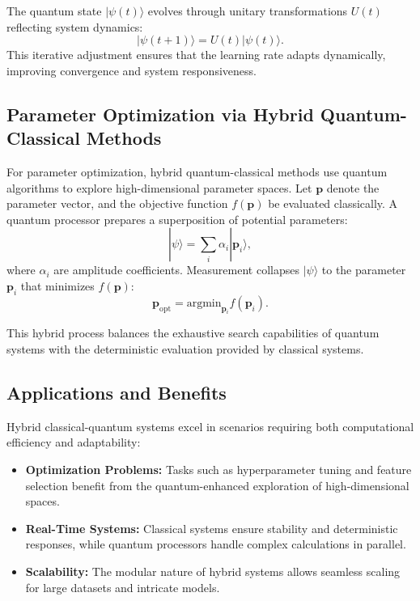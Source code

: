 \documentclass{article}
\theoremstyle{plain}
\begin{document}
The quantum state \( |\psi(t)\rangle \) evolves through unitary transformations \( U(t) \) reflecting system dynamics:
\begin{equation}
|\psi(t+1)\rangle = U(t) |\psi(t)\rangle.
\end{equation}
This iterative adjustment ensures that the learning rate adapts dynamically, improving convergence and system responsiveness.

\subsection{Parameter Optimization via Hybrid Quantum-Classical Methods}
For parameter optimization, hybrid quantum-classical methods use quantum algorithms to explore high-dimensional parameter spaces. Let \( \mathbf{p} \) denote the parameter vector, and the objective function \( f(\mathbf{p}) \) be evaluated classically. A quantum processor prepares a superposition of potential parameters:
\begin{equation}
|\psi\rangle = \sum_{i} \alpha_i |\mathbf{p}_i\rangle,
\end{equation}
where \( \alpha_i \) are amplitude coefficients. Measurement collapses \( |\psi\rangle \) to the parameter \( \mathbf{p}_i \) that minimizes \( f(\mathbf{p}) \):
\begin{equation}
\mathbf{p}_{\text{opt}} = \text{argmin}_{\mathbf{p}_i} f(\mathbf{p}_i).
\end{equation}

This hybrid process balances the exhaustive search capabilities of quantum systems with the deterministic evaluation provided by classical systems.

\subsection{Applications and Benefits}
Hybrid classical-quantum systems excel in scenarios requiring both computational efficiency and adaptability:
\begin{itemize}
    \item \textbf{Optimization Problems:} Tasks such as hyperparameter tuning and feature selection benefit from the quantum-enhanced exploration of high-dimensional spaces.
    \item \textbf{Real-Time Systems:} Classical systems ensure stability and deterministic responses, while quantum processors handle complex calculations in parallel.
    \item \textbf{Scalability:} The modular nature of hybrid systems allows seamless scaling for large datasets and intricate models.
\end{itemize}
\end{document}
